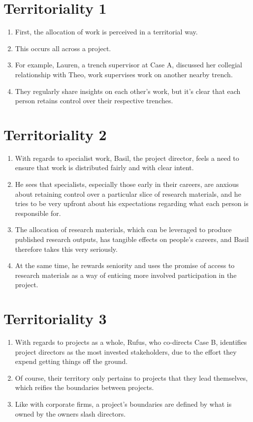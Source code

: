 \documentclass{article}
\begin{document}
\section{Territoriality 1}
\begin{enumerate}
  \item First, the allocation of work is perceived in a territorial way.
  \item This occurs all across a project.
  \item For example, Lauren, a trench supervisor at Case A, discussed her collegial relationship with Theo, work supervises work on another nearby trench.
  \item They regularly share insights on each other's work, but it's clear that each person retains control over their respective trenches.
  
\end{enumerate}

\section{Territoriality 2}
\begin{enumerate}
  \item With regards to specialist work, Basil, the project director, feels a need to ensure that work is distributed fairly and with clear intent.
  \item He sees that specialists, especially those early in their careers, are anxious about retaining control over a particular slice of research materials, and he tries to be very upfront about his expectations regarding what each person is responsible for.
  \item The allocation of research materials, which can be leveraged to produce published research outputs, has tangible effects on people's careers, and Basil therefore takes this very seriously.
  \item At the same time, he rewards seniority and uses the promise of access to research materials as a way of enticing more involved participation in the project.
  
\end{enumerate}
  
\section{Territoriality 3}
\begin{enumerate}
  \item With regards to projects as a whole, Rufus, who co-directs Case B, identifies project directors as the most invested stakeholders, due to the effort they expend getting things off the ground.
  \item Of course, their territory only pertains to projects that they lead themselves, which reifies the boundaries between projects.
  \item Like with corporate firms, a project's boundaries are defined by what is owned by the owners slash directors.
\end{enumerate}
  
\end{document}

